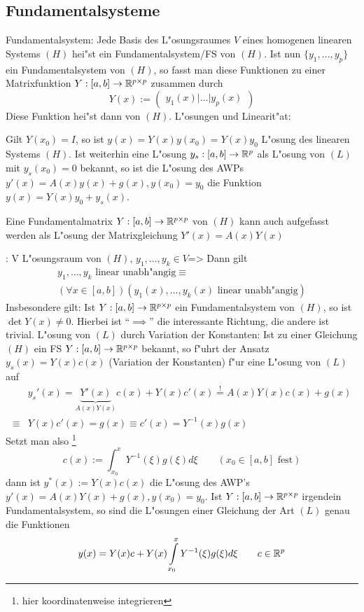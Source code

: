 \subsection{Fundamentalsysteme}
 Fundamentalsystem:{
  Jede Basis des L"osungsraumes $V$ eines homogenen linearen Systems $(H)$
  hei"st ein Fundamentalsystem/FS von $(H)$. Ist nun
  $\{y_1,\ldots,y_p\}$ ein Fundamentalsystem von $(H)$, so fasst man diese
  Funktionen zu einer Matrixfunktion $Y:[a,b]\to\mathbb R^{p\times p}$ zusammen
  durch
  \[Y(x):=\begin{pmatrix}
    y_1(x)|\ldots|y_p(x)
    \end{pmatrix}
    \]
  Diese Funktion hei"st dann  von $(H)$. 
  }
\remark L"osungen und Linearit"at:{
  Gilt $Y(x_0)=I$, so ist $y(x)=Y(x)y(x_0)=Y(x)y_0$ L"osung des 
  linearen Systems $(H)$. Ist weiterhin eine L"osung $y_s:[a,b]\to\mathbb R^p$
  als L"osung von $(L)$ mit $y_s(x_0)=0$ bekannt, so ist die
  L"osung des AWPs $y'(x)=A(x)y(x)+g(x),y(x_0)=y_0$ die Funktion
  $y(x)=Y(x)y_0+y_s(x)$.
  
  Eine Fundamentalmatrix $Y:[a,b]\to\mathbb R^{p\times p}$ von $(H)$ kann auch
  aufgefasst werden als L"osung der Matrixgleichung $Y'(x)=A(x)Y(x)$
  }
\theorem: V L"osungsraum von $(H)$, $y_1,\ldots,y_k\in V$=>{
  Dann gilt
  \begin{multline*}
    y_1,\ldots,y_k\text{ linear unabh"angig} \equiv \\
    (\forall x\in[a,b])(y_1(x),\ldots,y_k(x)\text{ linear unabh"angig})
    \end{multline*}
  Insbesondere gilt: Ist $Y:[a,b]\to\mathbb R^{p\times p}$ ein Fundamentalsystem
  von $(H)$, so ist $\det Y(x)\neq 0$.
  Hierbei ist ``$\implies$'' die interessante Richtung, die andere ist trivial.
  }
\remark L"osung von $(L)$ durch Variation der Konstanten:{
  Ist zu einer Gleichung $(H)$ ein FS $Y:[a,b]\to\mathbb R^{p\times p}$ bekannt,
  so f"uhrt der Ansatz $y_s(x)=Y(x)c(x)$ (Variation der Konstanten) f"ur
  eine L"osung von $(L)$ auf
  \begin{align*}
    & y_s'(x)=\underbrace{Y'(x)}_{A(x)Y(x)}c(x)+Y(x)c'(x)\overset !=A(x)Y(x)c(x)+g(x) \\
    \equiv & Y(x)c'(x)=g(x)\equiv c'(x)=Y^{-1}(x)g(x)
    \end{align*}
  Setzt man also \footnote{hier koordinatenweise integrieren}
  \[c(x):=\int_{x_0}^x Y^{-1}(\xi)g(\xi)d\xi
    \qquad(x_0\in[a,b]\text{ fest})
    \]
  dann ist $y^*(x):=Y(x)c(x)$ die L"osung des AWP's 
  $y'(x)=A(x)Y(x)+g(x),y(x_0)=y_0$. Ist $Y:[a,b]\to\mathbb R^{p\times p}$
  irgendein Fundamentalsystem, so sind die L"osungen einer Gleichung der Art
  $(L)$ genau die Funktionen 
  \[y(x)=Y(x)c+Y(x)\int_{x_0}^x Y^{-1}(\xi)g(\xi)d\xi \qquad c\in\SetR^p
    \]
  }
